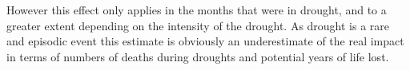 \documentclass[a4paper]{article}                %
\begin{document}
However this effect only applies in the months that were in
drought, and to a greater extent depending on the intensity of the drought.
As drought is a rare and episodic event this estimate is obviously an underestimate of the real impact in terms of numbers of deaths during droughts and potential years of life lost.







\end{document}
